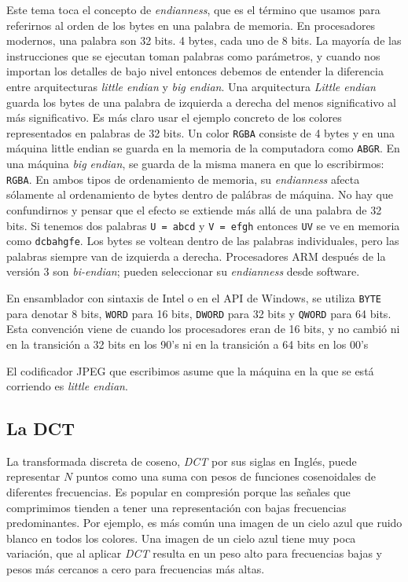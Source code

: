 Este tema toca el concepto de \emph{endianness}, que es el término que usamos
para referirnos al orden de los bytes en una palabra de memoria. En
procesadores modernos, una palabra son 32 bits. 4 bytes, cada uno de 8 bits. La
mayoría de las instrucciones que se ejecutan toman palabras como parámetros, y
cuando nos importan los detalles de bajo nivel entonces debemos de entender la
diferencia entre arquitecturas \emph{little endian} y \emph{big endian}. Una
arquitectura \emph{Little endian} guarda los bytes de una palabra de izquierda
a derecha del menos significativo al más significativo. Es más claro usar el
ejemplo concreto de los colores representados en palabras de 32 bits. Un color
\verb+RGBA+ consiste de 4 bytes y en una máquina little endian se guarda en la
memoria de la computadora como \verb+ABGR+. En una máquina \emph{big endian},
se guarda de la misma manera en que lo escribirmos: \verb+RGBA+. En ambos tipos
de ordenamiento de memoria, su \emph{endianness} afecta sólamente al
ordenamiento de bytes dentro de palábras de máquina. No hay que confundirnos y
pensar que el efecto se extiende más allá de una palabra de 32 bits. Si tenemos
dos palabras \verb+U = abcd+ y \verb+V = efgh+ entonces \verb+UV+ se ve en
memoria como \verb+dcbahgfe+. Los bytes se voltean dentro de las palabras
individuales, pero las palabras siempre van de izquierda a derecha.
Procesadores ARM después de la versión 3 son \emph{bi-endian}; pueden
seleccionar su \emph{endianness} desde software.

En ensamblador con sintaxis de Intel o en el API de Windows, se utiliza
\verb+BYTE+ para denotar 8 bits, \verb+WORD+ para 16 bits, \verb+DWORD+ para 32
bits y \verb+QWORD+ para 64 bits. Esta convención viene de cuando los
procesadores eran de 16 bits, y no cambió ni en la transición a 32 bits en los
90's ni en la transición a 64 bits en los 00's

El codificador JPEG que escribimos asume que la máquina en la que se está
corriendo es \emph{little endian}.


\subsection{La DCT}

La transformada discreta de coseno, \emph{DCT} por sus siglas en Inglés, puede
representar $N$ puntos como una suma con pesos de funciones cosenoidales de
diferentes frecuencias. Es popular en compresión porque las señales que
comprimimos tienden a tener una representación con bajas frecuencias
predominantes. Por ejemplo, es más común una imagen de un cielo azul que ruido
blanco en todos los colores. Una imagen de un cielo azul tiene muy poca
variación, que al aplicar \emph{DCT} resulta en un peso alto para frecuencias
bajas y pesos más cercanos a cero para frecuencias más altas.

